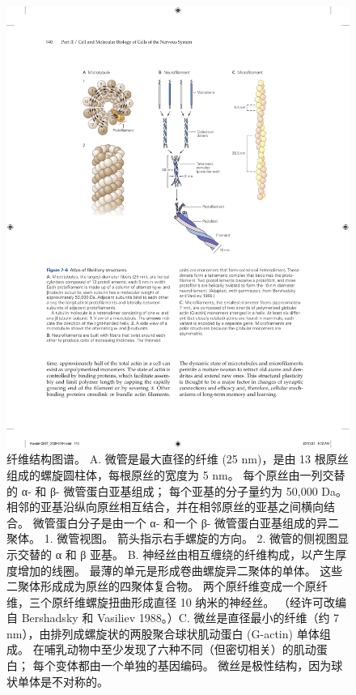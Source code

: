 \begin{figure}[htbp]
	\centering
	\includegraphics[width=1.0\linewidth]{chap07/fig_7_6}
	\caption{纤维结构图谱。 A. 微管是最大直径的纤维 (25 nm)，是由 13 根原丝组成的螺旋圆柱体，每根原丝的宽度为 5 nm。 每个原丝由一列交替的 α- 和 β- 微管蛋白亚基组成； 每个亚基的分子量约为 50,000 Da。 相邻的亚基沿纵向原丝相互结合，并在相邻原丝的亚基之间横向结合。 微管蛋白分子是由一个 α- 和一个 β- 微管蛋白亚基组成的异二聚体。 1. 微管视图。 箭头指示右手螺旋的方向。 2. 微管的侧视图显示交替的 α 和 β 亚基。 B. 神经丝由相互缠绕的纤维构成，以产生厚度增加的线圈。 最薄的单元是形成卷曲螺旋异二聚体的单体。 这些二聚体形成成为原丝的四聚体复合物。 两个原纤维变成一个原纤维，三个原纤维螺旋扭曲形成直径 10 纳米的神经丝。 （经许可改编自 Bershadsky 和 Vasiliev 1988。）C. 微丝是直径最小的纤维（约 7 nm），由排列成螺旋状的两股聚合球状肌动蛋白 (G-actin) 单体组成。 在哺乳动物中至少发现了六种不同（但密切相关）的肌动蛋白； 每个变体都由一个单独的基因编码。 微丝是极性结构，因为球状单体是不对称的。}
	\label{fig:7_6}
\end{figure}



